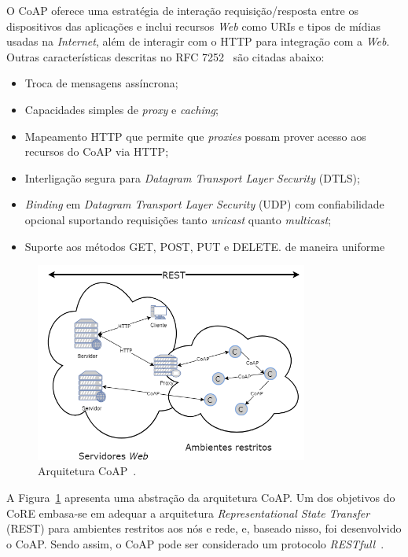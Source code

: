 O CoAP oferece uma estratégia de interação requisição/resposta entre os dispositivos das aplicações e inclui recursos \textit{Web} como URIs e tipos de mídias usadas na \textit{Internet}, além de interagir com o HTTP para integração com a \textit{Web}. Outras características descritas no RFC 7252~\cite{shelby2014constrained} são citadas abaixo:
\begin{itemize}
    \item Troca de mensagens assíncrona;
    \item Capacidades simples de \textit{proxy} e \textit{caching};
    \item Mapeamento HTTP que permite que \textit{proxies} possam prover acesso aos recursos do CoAP via HTTP;
    \item Interligação segura para \textit{Datagram Transport Layer Security} (DTLS);
    \item \textit{Binding} em \textit{Datagram Transport Layer Security} (UDP) com confiabilidade opcional suportando requisições tanto \textit{unicast} quanto \textit{multicast};
    \item Suporte aos métodos GET, POST, PUT e DELETE.
de maneira uniforme
\end{itemize}

\begin{figure}[ht]
\centering
\includegraphics[width=0.8\textwidth]{imagens/coap_arq.png}
\caption{Arquitetura CoAP~\cite{shelby2014constrained}.
\label{fig:coap_arq}}
\end{figure}
\FloatBarrier
 
 A Figura~\ref{fig:coap_arq} apresenta uma abstração da arquitetura CoAP. Um dos objetivos do CoRE embasa-se em adequar a arquitetura \textit{Representational State Transfer} (REST) para ambientes restritos aos nós e rede, e, baseado nisso, foi desenvolvido o CoAP. Sendo assim, o CoAP pode ser considerado um protocolo \textit{RESTfull}~\cite{shelby2014constrained}.
 
